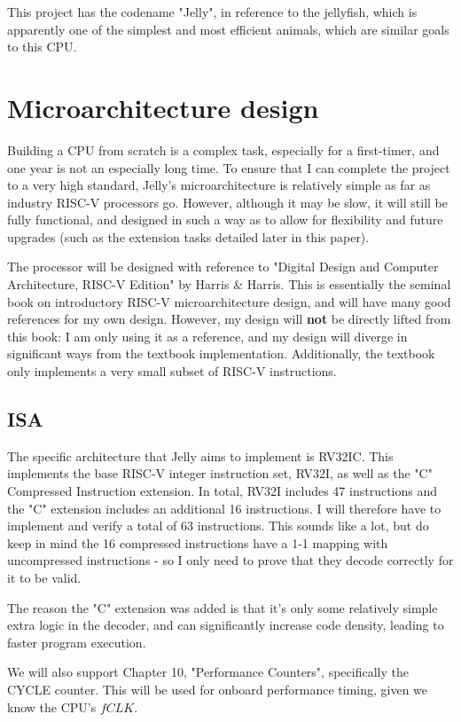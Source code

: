 \documentclass{article}
\begin{document}
This project has the codename "Jelly", in
reference to the jellyfish, which is apparently one of the simplest and most efficient animals, which are
similar goals to this CPU.

\section{Microarchitecture design}
Building a CPU from scratch is a complex task, especially for a first-timer, and one year is not an especially
long time. To ensure that I can complete the project to a very high standard, Jelly's microarchitecture is
relatively simple as far as industry RISC-V processors go. However, although it may be slow, it will still be
fully functional, and designed in such a way as to allow for flexibility and future upgrades (such as the
extension tasks detailed later in this paper).

The processor will be designed with reference to "Digital Design and Computer Architecture, RISC-V Edition" 
by Harris \& Harris. This is essentially the seminal book on introductory RISC-V microarchitecture design, and 
will have many good references for my own design. However, my design will \textbf{not} be directly lifted from
this book: I am only using it as a reference, and my design will diverge in significant ways from the textbook
implementation. Additionally, the textbook only implements a very small subset of RISC-V instructions.

\subsection{ISA}
The specific architecture that Jelly aims to implement is RV32IC. This implements the base RISC-V integer
instruction set, RV32I, as well as the "C" Compressed Instruction extension. In total, RV32I includes 47
instructions and the "C" extension includes an additional 16 instructions. I will therefore have to implement
and verify a total of 63 instructions. This sounds like a lot, but do keep in mind the 16 compressed
instructions have a 1-1 mapping with uncompressed instructions - so I only need to prove that they decode
correctly for it to be valid.

The reason the "C" extension was added is that it's only some relatively simple extra logic in the decoder,
and can significantly increase code density, leading to faster program execution.

We will also support Chapter 10, "Performance Counters", specifically the CYCLE counter. This will be used
for onboard performance timing, given we know the CPU's $fCLK$.
\end{document}
